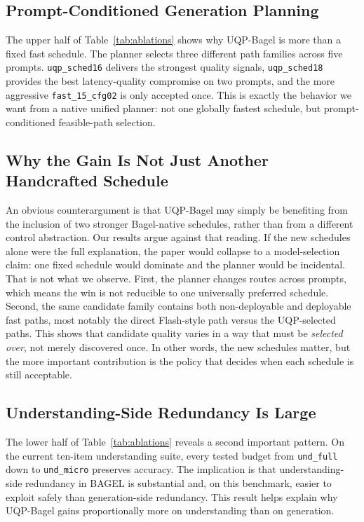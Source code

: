 \documentclass{article}
\begin{document}
\subsection{Prompt-Conditioned Generation Planning}
The upper half of Table~\ref{tab:ablations} shows why UQP-Bagel is more than a fixed fast schedule. The planner selects three different path families across five prompts. \texttt{uqp\_sched16} delivers the strongest quality signals, \texttt{uqp\_sched18} provides the best latency-quality compromise on two prompts, and the more aggressive \texttt{fast\_15\_cfg02} is only accepted once. This is exactly the behavior we want from a native unified planner: not one globally fastest schedule, but prompt-conditioned feasible-path selection.

\subsection{Why the Gain Is Not Just Another Handcrafted Schedule}
An obvious counterargument is that UQP-Bagel may simply be benefiting from the inclusion of two stronger Bagel-native schedules, rather than from a different control abstraction. Our results argue against that reading. If the new schedules alone were the full explanation, the paper would collapse to a model-selection claim: one fixed schedule would dominate and the planner would be incidental. That is not what we observe. First, the planner changes routes across prompts, which means the win is not reducible to one universally preferred schedule. Second, the same candidate family contains both non-deployable and deployable fast paths, most notably the direct Flash-style path versus the UQP-selected paths. This shows that candidate quality varies in a way that must be \emph{selected over}, not merely discovered once. In other words, the new schedules matter, but the more important contribution is the policy that decides when each schedule is still acceptable.

\subsection{Understanding-Side Redundancy Is Large}
The lower half of Table~\ref{tab:ablations} reveals a second important pattern. On the current ten-item understanding suite, every tested budget from \texttt{und\_full} down to \texttt{und\_micro} preserves accuracy. The implication is that understanding-side redundancy in BAGEL is substantial and, on this benchmark, easier to exploit safely than generation-side redundancy. This result helps explain why UQP-Bagel gains proportionally more on understanding than on generation.
\end{document}
